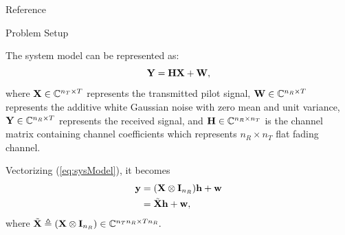 \documentclass[hyperref={bookmarks=false}]{beamer}
\numberwithin{figure}{section}
\begin{document}
\begin{frame}{Reference}

\end{frame}


\begin{frame}{Problem Setup}

The system model can be represented as:
    \begin{equation} \label{eq:sysModel}
        {\bf Y} = {\bf H}{\bf X} + {\bf W},
    \end{equation}
where ${\bf X} \in \mathbb{C}^{n_T \times T}$ represents the transmitted pilot signal, ${\bf W} \in \mathbb{C}^{n_R \times T}$ represents the additive white Gaussian noise
with zero mean and unit variance, ${\bf Y} \in \mathbb{C}^{n_R \times T}$ represents the received signal, and ${\bf H} \in \mathbb{C}^{n_R \times n_T}$ 
is the channel matrix containing channel coefficients which represents $n_R \times n_T$ flat fading channel.

Vectorizing (\ref{eq:sysModel}), it becomes 
    \begin{align} \label{vecSysModel}
        {\bf y} &= ({\bf X} \otimes {\bf I}_{n_R}){\bf h} + {\bf w} \notag \\ &= \tilde{{\bf X}}{\bf h} + {\bf w},
    \end{align}
    where $\tilde{{\bf X}} \triangleq ({\bf X} \otimes {\bf I}_{n_R}) \in \mathbb{C}^{n_T n_R \times T n_R}.$

\end{frame}
\end{document}
